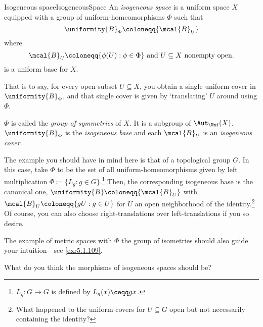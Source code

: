 \begin{dfn}{Isogeneous space}{IsogeneousSpace}
An \emph{isogeneous space} is a uniform space $X$ equipped with a group of uniform-homeomorphisms $\Phi$ such that
\begin{equation}\label{5.1.28}
\uniformity{B}_\Phi \coloneqq \{ \mcal{B}_U\}
\end{equation}
where
\begin{equation}
\mcal{B}_U\coloneqq \{ \phi (U):\phi \in \Phi\} \text{ and }U\subseteq X\text{ nonempty open}.
\end{equation}
is a uniform base for $X$.
\begin{rmk}
That is to say, for every open subset $U\subseteq X$, you obtain a single uniform cover in $\uniformity{B}_{\Phi}$, and that single cover is given by `translating' $U$ around using $\Phi$.
\end{rmk}
\begin{rmk}
$\Phi$ is called the \emph{group of symmetries} of $X$.  It is a subgroup of $\Aut _{\Uni}(X)$.  $\uniformity{B}_{\Phi}$ is the \emph{isogeneous base} and each $\mcal{B}_U$ is an \emph{isogeneous cover}.
\end{rmk}
\begin{rmk}
The example you should have in mind here is that of a topological group $G$.  In this case, take $\Phi$ to be the set of all uniform-homeomorphisms given by left multiplication $\Phi \coloneqq \{ L_g:g\in G\}$.\footnote{$L_g\colon G\rightarrow G$ is defined by $L_g(x)\ceqq gx$.}  Then, the corresponding isogeneous base is the canonical one, $\uniformity{B}\coloneqq \{ \mcal{B}_U\}$ with $\mcal{B}_U\coloneqq \{ gU:g\in U\}$ for $U$ an open neighborhood of the identity.\footnote{What happened to the uniform covers for $U\subseteq G$ open but not necessarily containing the identity?}  Of course, you can also choose right-translations over left-translations if you so desire.
\end{rmk}
\begin{rmk}
The example of metric spaces with $\Phi$ the group of isometries should also guide your intuition---see \cref{exr5.1.109}.
\end{rmk}
\begin{rmk}
What do you think the morphisms of isogeneous spaces should be?
\end{rmk}
\end{dfn}

